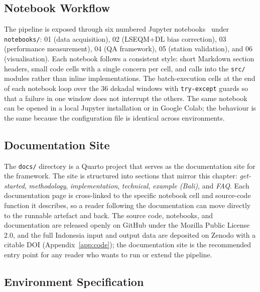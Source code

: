 \subsection{Notebook Workflow}

The pipeline is exposed through six numbered Jupyter
notebooks~\citep{ref:kluyver2016} under \texttt{notebooks/}: 01 (data acquisition), 02 (LSEQM+DL
bias correction), 03 (performance measurement), 04 (QA
framework), 05 (station validation), and 06 (visualisation).
Each notebook follows a
consistent style: short Markdown section headers, small code
cells with a single concern per cell, and calls into the
\texttt{src/} modules rather than inline implementations. The
batch-execution cells at the end of each notebook loop over the
36 dekadal windows with \texttt{try-except} guards so that a
failure in one window does not interrupt the others. The same
notebook can be opened in a local Jupyter installation or in
Google Colab; the behaviour is the same because the configuration
file is identical across environments.

\subsection{Documentation Site}

The \texttt{docs/} directory is a Quarto project that serves as
the documentation site for the framework. The site is structured
into sections that mirror this chapter: \textit{get-started},
\textit{methodology}, \textit{implementation}, \textit{technical},
\textit{example (Bali)}, and \textit{FAQ}. Each documentation page
is cross-linked to the specific notebook cell and source-code
function it describes, so a reader following the documentation can
move directly to the runnable artefact and back. The source code,
notebooks, and documentation are released openly on GitHub under
the Mozilla Public License 2.0, and the full Indonesia input and
output data are deposited on Zenodo with a citable DOI
(Appendix~\ref{app:code}); the documentation site is the
recommended entry point for any reader who wants to run or extend
the pipeline.

\subsection{Environment Specification}

